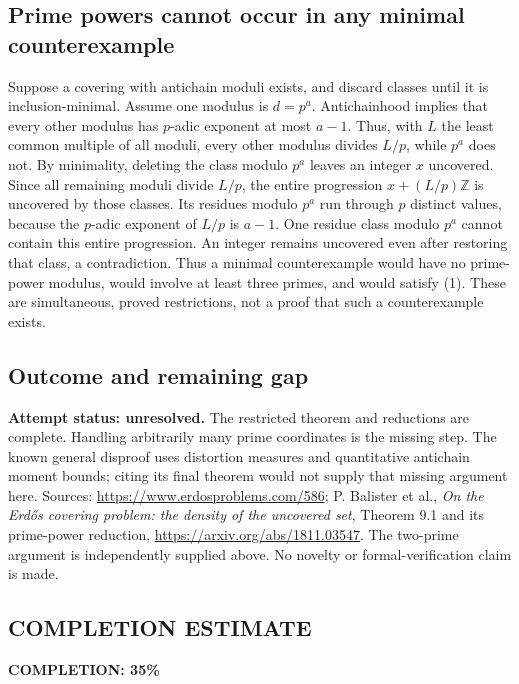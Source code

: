 \subsection*{Prime powers cannot occur in any minimal counterexample}
Suppose a covering with antichain moduli exists, and discard classes until it is inclusion-minimal. Assume one modulus is $d=p^a$. Antichainhood implies that every other modulus has $p$-adic exponent at most $a-1$. Thus, with $L$ the least common multiple of all moduli, every other modulus divides $L/p$, while $p^a$ does not.
By minimality, deleting the class modulo $p^a$ leaves an integer $x$ uncovered. Since all remaining moduli divide $L/p$, the entire progression $x+(L/p)\mathbb Z$ is uncovered by those classes. Its residues modulo $p^a$ run through $p$ distinct values, because the $p$-adic exponent of $L/p$ is $a-1$. One residue class modulo $p^a$ cannot contain this entire progression. An integer remains uncovered even after restoring that class, a contradiction.
Thus a minimal counterexample would have no prime-power modulus, would involve at least three primes, and would satisfy (1). These are simultaneous, proved restrictions, not a proof that such a counterexample exists.

\subsection*{Outcome and remaining gap}
\textbf{Attempt status: unresolved.} The restricted theorem and reductions are complete. Handling arbitrarily many prime coordinates is the missing step. The known general disproof uses distortion measures and quantitative antichain moment bounds; citing its final theorem would not supply that missing argument here.
Sources: \url{https://www.erdosproblems.com/586}; P. Balister et al., \emph{On the Erd\H{o}s covering problem: the density of the uncovered set}, Theorem 9.1 and its prime-power reduction, \url{https://arxiv.org/abs/1811.03547}. The two-prime argument is independently supplied above. No novelty or formal-verification claim is made.

\subsection*{COMPLETION ESTIMATE}
\textbf{COMPLETION: 35\%}
